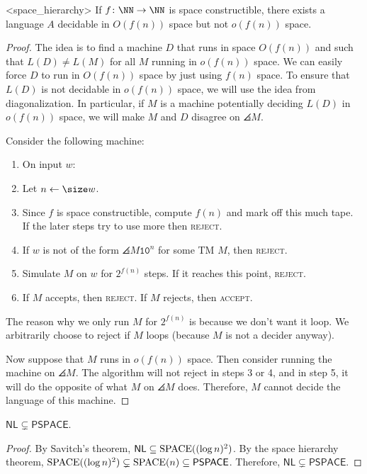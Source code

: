 \documentclass{scrartcl}
\begin{document}
\begin{theorem}<space_hierarchy>
  If \(f \colon \NN \to \NN\) is space constructible,
  there exists a language \(A\) decidable in \(O(f(n))\) space
  but not \(o(f(n))\) space.
\end{theorem}
\begin{proof}
  The idea is to find a machine \(D\) that runs in space \(O(f(n))\)
  and such that \(L(D) \neq L(M)\) for all \(M\) running in \(o(f(n))\) space.
  We can easily force \(D\) to run in \(O(f(n))\) space
  by just using \(f(n)\) space.
  To ensure that \(L(D)\) is not decidable in \(o(f(n))\) space,
  we will use the idea from diagonalization.
  In particular, if \(M\) is a machine potentially deciding \(L(D)\)
  in \(o(f(n))\) space, we will make \(M\) and \(D\) disagree on \(\angles M\).
  
  Consider the following machine:
  \begin{enumerate}[start=0]
    \item On input \(w\):
    \item Let \(n \gets \size w\).
    \item Since \(f\) is space constructible,
          compute \(f(n)\) and mark off this much tape.
          If the later steps try to use more then \textsc{reject}.
    \item If \(w\) is not of the form \(\angles M \mathtt 1 \mathtt 0^n\)
          for some \textsf{TM} \(M\), then \textsc{reject}.
    \item Simulate \(M\) on \(w\) for \(2^{f(n)}\) steps. If it reaches this point, \textsc{reject}.
    \item If \(M\) accepts, then \textsc{reject}. If \(M\) rejects, then \textsc{accept}.
  \end{enumerate}

  The reason why we only run \(M\) for \(2^{f(n)}\)
  is because we don't want it loop.
  We arbitrarily choose to reject if \(M\) loops
  (because \(M\) is not a decider anyway).

  Now suppose that \(M\) runs in \(o(f(n))\) space.
  Then consider running the machine on \(\angles M\).
  The algorithm will not reject in steps 3 or 4, and in step 5,
  it will do the opposite of what \(M\) on \(\angles M\) does.
  Therefore, \(M\) cannot decide the language of this machine.
\end{proof}

\begin{corollary}
  \(\mathsf{NL} \subsetneq \mathsf{PSPACE}\).
\end{corollary}
\begin{proof}
  By Savitch's theorem, \(\mathsf{NL} \subseteq \operatorname{SPACE}((\log n)^2)\).
  By the space hierarchy theorem,
  \(\operatorname{SPACE}((\log n)^2) \subsetneq \operatorname{SPACE}(n) \subseteq \mathsf{PSPACE}\).
  Therefore, \(\mathsf{NL} \subsetneq \mathsf{PSPACE}\).
\end{proof}
\end{document}
